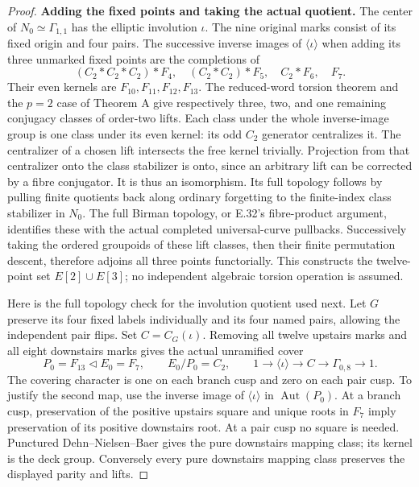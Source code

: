 \begin{proof}
\par\medskip\noindent\textbf{Adding the fixed points and taking the actual quotient.}\quad
The center of $N_0\simeq\Gamma_{1,1}$ has the elliptic
involution $\iota$.  The nine original marks consist of its
fixed origin and four pairs.  The successive inverse images of
$\langle\iota\rangle$ when adding its three unmarked fixed
points are the completions of
\[
 (C_2*C_2*C_2)*F_4,\quad
 (C_2*C_2)*F_5,\quad C_2*F_6,\quad F_7.
                                                               \tag{E.256}
\]
Their even kernels are $F_{10},F_{11},F_{12},F_{13}$.
The reduced-word torsion theorem and the $p=2$ case of
Theorem A give respectively three, two, and one remaining
conjugacy classes of order-two lifts.  Each class under the
whole inverse-image group is one class under its even kernel:
its odd $C_2$ generator centralizes it.
The centralizer of a chosen lift intersects the free kernel
trivially.  Projection from that centralizer onto the class
stabilizer is onto, since an arbitrary lift can be corrected by
a fibre conjugator.  It is thus an isomorphism.  Its full
topology follows by pulling finite quotients back along
ordinary forgetting to the finite-index class stabilizer in
$N_0$.  The full Birman topology, or E.32's fibre-product
argument, identifies these with the actual completed
universal-curve pullbacks.
Successively taking the ordered groupoids of these lift
classes, then their finite permutation descent, therefore
adjoins all three points functorially.  This constructs the
twelve-point set $E[2]\cup E[3]$; no independent algebraic
torsion operation is assumed.

Here is the full topology check for the involution quotient
used next.  Let $G$ preserve its four fixed labels individually
and its four named pairs, allowing the independent pair flips.
Set $C=C_G(\iota)$.  Removing all twelve upstairs marks and all
eight downstairs marks gives the actual unramified cover
\[
 P_0=F_{13}\triangleleft E_0=F_7,\qquad E_0/P_0=C_2,
 \qquad
 1\longrightarrow\langle\iota\rangle\longrightarrow C
 \longrightarrow\Gamma_{0,8}\longrightarrow1.
                                                               \tag{E.257}
\]
The covering character is one on each branch cusp and zero
on each pair cusp.  To justify the second map, use the inverse
image of $\langle\iota\rangle$ in
$\operatorname{Aut}(P_0)$.  At a branch cusp, preservation of
the positive upstairs square and unique roots in $F_7$ imply
preservation of its positive downstairs root.  At a pair
cusp no square is needed.  Punctured Dehn--Nielsen--Baer
gives the pure downstairs mapping class; its kernel is the
deck group.  Conversely every pure downstairs mapping class
preserves the displayed parity and lifts.


\end{proof}
